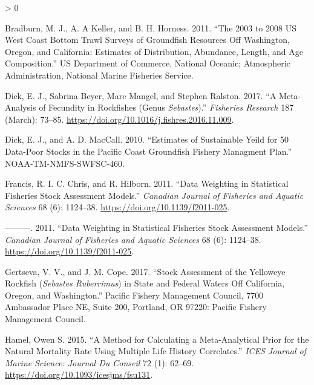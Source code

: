 \documentclass[11pt,
  english,
  a4paper,
]{article}
\newlength{\cslhangindent}
\newenvironment{CSLReferences}[2] %
 {%
  \setlength{\parindent}{0pt}
  \ifodd #1 \everypar{\setlength{\hangindent}{\cslhangindent}}\ignorespaces\fi
  \ifnum #2 > 0
  \setlength{\parskip}{#2\baselineskip}
  \fi
 }%
 {}
\begin{document}
\leavevmode\tagmcend\tagstructend


\hypertarget{refs}{}
\begin{CSLReferences}{1}{0}
\leavevmode\hypertarget{ref-bradburn_2003_2011}{}%
Bradburn, M. J., A. A Keller, and B. H. Horness. 2011. {``The 2003 to 2008 {US} {West} {Coast} Bottom Trawl Surveys of Groundfish Resources Off {Washington}, {Oregon}, and {California}: Estimates of Distribution, Abundance, Length, and Age Composition.''} US Department of Commerce, National Oceanic; Atmospheric Administration, National Marine Fisheries Service.

\leavevmode\hypertarget{ref-dick_meta-analysis_2017}{}%
Dick, E. J., Sabrina Beyer, Marc Mangel, and Stephen Ralston. 2017. {``A Meta-Analysis of Fecundity in Rockfishes (Genus \emph{Sebastes}).''} \emph{Fisheries Research} 187 (March): 73--85. \url{https://doi.org/10.1016/j.fishres.2016.11.009}.

\leavevmode\hypertarget{ref-dick_estimates_2010}{}%
Dick, E. J., and A. D. MacCall. 2010. {``Estimates of Sustainable Yeild for 50 Data-Poor Stocks in the {Pacific} {Coast} Groundfish Fishery Managment Plan.''} NOAA-TM-NMFS-SWFSC-460.

\leavevmode\hypertarget{ref-francis_data_2011}{}%
Francis, R. I. C. Chris, and R. Hilborn. 2011. {``Data Weighting in Statistical Fisheries Stock Assessment Models.''} \emph{Canadian Journal of Fisheries and Aquatic Sciences} 68 (6): 1124--38. \url{https://doi.org/10.1139/f2011-025}.

\leavevmode\hypertarget{ref-francis_data_2011}{}%
---------. 2011. {``Data Weighting in Statistical Fisheries Stock Assessment Models.''} \emph{Canadian Journal of Fisheries and Aquatic Sciences} 68 (6): 1124--38. \url{https://doi.org/10.1139/f2011-025}.

\leavevmode\hypertarget{ref-gertseva_stock_2017}{}%
Gertseva, V. V., and J. M. Cope. 2017. {``Stock Assessment of the Yelloweye Rockfish (\emph{{Sebastes} Ruberrimus}) in State and {Federal} Waters Off {California}, {Oregon}, and {Washington}.''} Pacific Fishery Management Council, 7700 Ambassador Place NE, Suite 200, Portland, OR 97220: Pacific Fishery Management Council.

\leavevmode\hypertarget{ref-hamel_method_2015}{}%
Hamel, Owen S. 2015. {``A Method for Calculating a Meta-Analytical Prior for the Natural Mortality Rate Using Multiple Life History Correlates.''} \emph{ICES Journal of Marine Science: Journal Du Conseil} 72 (1): 62--69. \url{https://doi.org/10.1093/icesjms/fsu131}.


\end{CSLReferences}
\end{document}

